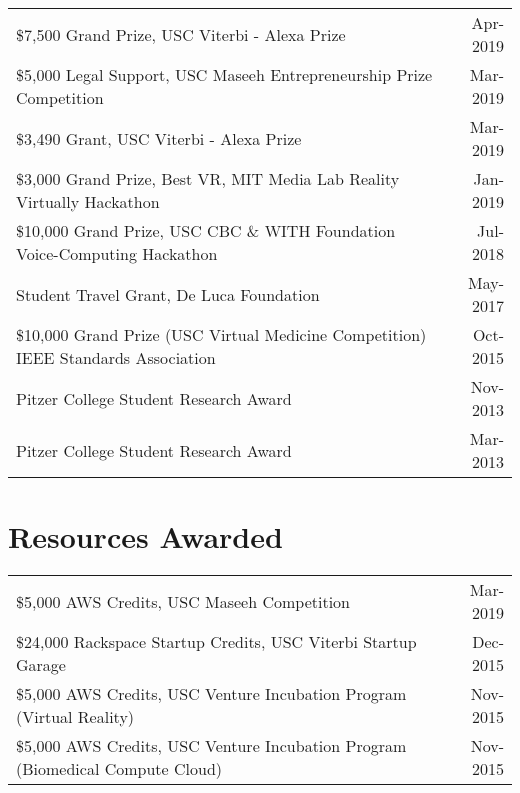 \documentclass[10pt,a4paper]{article}
\begin{document}
  \vspace*{1mm}\noindent\begin{tabularx}{17cm}{X r}
    \$7,500 Grand Prize, USC Viterbi - Alexa Prize & Apr-2019 \\ %
    \$5,000 Legal Support, USC Maseeh Entrepreneurship Prize Competition & Mar-2019 \\ %
    \$3,490 Grant, USC Viterbi - Alexa Prize & Mar-2019 \\ %
    \$3,000 Grand Prize, Best VR, MIT Media Lab Reality Virtually Hackathon & Jan-2019\\ %
  	\$10,000 Grand Prize, USC CBC \& WITH Foundation Voice-Computing Hackathon & Jul-2018\\ %
    Student Travel Grant, De Luca Foundation & May-2017\\ %
    \$10,000 Grand Prize (USC Virtual Medicine Competition) IEEE Standards Association  & Oct-2015\\ %
    Pitzer College Student Research Award & Nov-2013 \\
    Pitzer College Student Research Award & Mar-2013 \\

  \end{tabularx}

\vspace*{2mm}\section*{Resources Awarded}
  
  \vspace*{1mm}\noindent\begin{tabularx}{17cm}{X r}

    \$5,000 AWS Credits, USC Maseeh Competition & Mar-2019\\
    \$24,000 Rackspace Startup Credits, USC Viterbi Startup Garage & Dec-2015\\
    \$5,000 AWS Credits, USC Venture Incubation Program (Virtual Reality) & Nov-2015\\
    \$5,000 AWS Credits, USC Venture Incubation Program (Biomedical Compute Cloud) & Nov-2015\\

  \end{tabularx}
\end{document}
